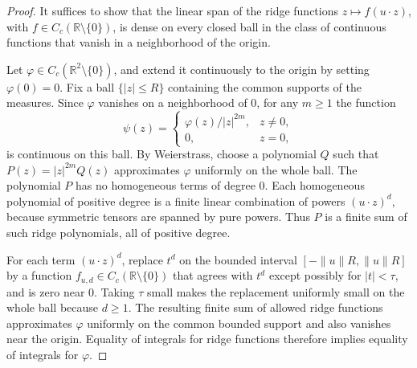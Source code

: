 \documentclass[11pt]{article}
\newcommand{\R}{\mathbb R}
\begin{document}
\begin{proof}
It suffices to show that the linear span of the ridge functions
$z\mapsto f(u\cdot z)$, with $f\in C_c(\R\setminus\{0\})$, is dense on every
closed ball in the class of continuous functions that vanish in a neighborhood
of the origin.

Let $\varphi\in C_c(\R^2\setminus\{0\})$, and extend it continuously to the
origin by setting $\varphi(0)=0$.  Fix a ball $\{|z|\le R\}$ containing the
common supports of the measures.  Since $\varphi$ vanishes on a neighborhood
of $0$, for any $m\ge1$ the function
\[
  \psi(z)=
  \begin{cases}
    \varphi(z)/|z|^{2m},&z\ne0,\\
    0,&z=0,
  \end{cases}
\]
is continuous on this ball.  By Weierstrass, choose a polynomial $Q$ such that
$P(z)=|z|^{2m}Q(z)$ approximates $\varphi$ uniformly on the whole ball.  The
polynomial $P$ has no homogeneous terms of degree $0$.  Each homogeneous
polynomial of positive degree is a finite linear combination of powers
$(u\cdot z)^d$, because symmetric tensors are spanned by pure powers.  Thus
$P$ is a finite sum of such ridge polynomials, all of positive degree.

For each term $(u\cdot z)^d$, replace $t^d$ on the bounded interval
$[-\|u\|R,\|u\|R]$ by a function $f_{u,d}\in C_c(\R\setminus\{0\})$ that agrees
with $t^d$ except possibly for $|t|<\tau$, and is zero near $0$.  Taking
$\tau$ small makes the replacement uniformly small on the whole ball because
$d\ge1$.  The resulting finite sum of allowed ridge functions approximates
$\varphi$ uniformly on the common bounded support and also vanishes near the
origin.  Equality of integrals for ridge functions therefore implies equality
of integrals for $\varphi$.
\end{proof}
\end{document}

